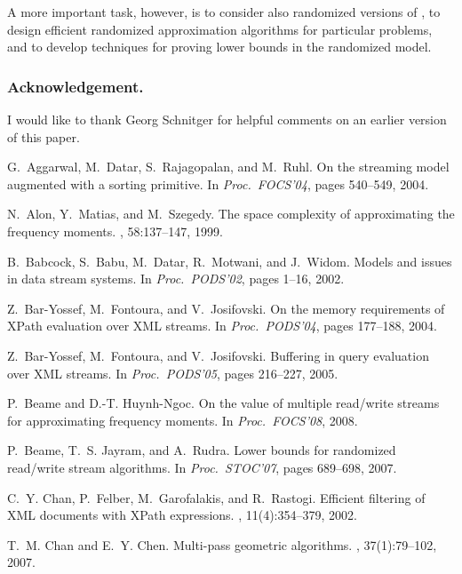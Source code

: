 \documentclass[proceedings]{stacs}
\theoremstyle{plain}\newtheorem{satz}[thm]{Satz}
\theoremstyle{definition}\newtheorem{crucial}[thm]{Crucial Definition}
\newcommand{\myparagraph}[1]{\subsubsection*{{\bf #1}}}
\newcommand{\auta}{\text{mp2s-automata}}
\begin{document}
A more important task, however, is to consider also randomized versions
of \auta{}, to design efficient randomized approximation algorithms for particular
problems, and to develop techniques for proving lower bounds in the randomized model.


\myparagraph{Acknowledgement.}
I would like to thank Georg Schnitger for
helpful comments on an earlier version of this paper.


\begin{thebibliography}{10}

G.~Aggarwal, M.~Datar, S.~Rajagopalan, and M.~Ruhl.
\newblock On the streaming model augmented with a sorting primitive.
\newblock In {\em Proc.\ FOCS'04}, pages 540--549, 2004.

N.~Alon, Y.~Matias, and M.~Szegedy.
\newblock The space complexity of approximating the frequency moments.
, 58:137--147, 1999.

B.~Babcock, S.~Babu, M.~Datar, R.~Motwani, and J.~Widom.
\newblock Models and issues in data stream systems.
\newblock In {\em Proc.\ PODS'02}, pages 1--16, 2002.

Z.~Bar-Yossef, M.~Fontoura, and V.~Josifovski.
\newblock On the memory requirements of {XPath} evaluation over {XML} streams.
\newblock In {\em Proc.\ PODS'04}, pages 177--188, 2004.

Z.~Bar-Yossef, M.~Fontoura, and V.~Josifovski.
\newblock Buffering in query evaluation over {XML} streams.
\newblock In {\em Proc.\ PODS'05}, pages 216--227, 2005.

P.~Beame and D.-T. Huynh-Ngoc.
\newblock On the value of multiple read/write streams for approximating
  frequency moments.
\newblock In {\em Proc.\ FOCS'08}, 2008.

P.~Beame, T.~S. Jayram, and A.~Rudra.
\newblock Lower bounds for randomized read/write stream algorithms.
\newblock In {\em Proc.\ STOC'07}, pages 689--698, 2007.

C.~Y. Chan, P.~Felber, M.~Garofalakis, and R.~Rastogi.
\newblock Efficient filtering of {XML} documents with {XPath} expressions.
, 11(4):354--379, 2002.

T.~M. Chan and E.~Y. Chen.
\newblock Multi-pass geometric algorithms.
, 37(1):79--102, 2007.


\end{thebibliography}
\end{document}
